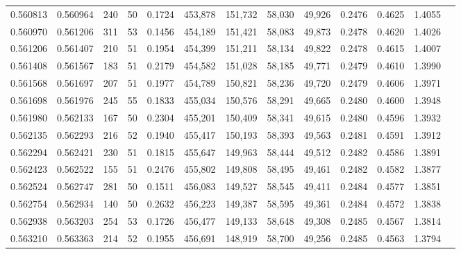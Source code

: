 \begin{tabular}{rrrrrrrrrrrrr}
0.560813 & 0.560964 &   240 &  50 &                                     0.1724 & 453,878 & 151,732 &  58,030 &  49,926 & 0.2476 & 0.4625 & 1.4055 \\
0.560970 & 0.561206 &   311 &  53 &                                     0.1456 & 454,189 & 151,421 &  58,083 &  49,873 & 0.2478 & 0.4620 & 1.4026 \\
0.561206 & 0.561407 &   210 &  51 &                                     0.1954 & 454,399 & 151,211 &  58,134 &  49,822 & 0.2478 & 0.4615 & 1.4007 \\
0.561408 & 0.561567 &   183 &  51 &                                     0.2179 & 454,582 & 151,028 &  58,185 &  49,771 & 0.2479 & 0.4610 & 1.3990 \\
0.561568 & 0.561697 &   207 &  51 &                                     0.1977 & 454,789 & 150,821 &  58,236 &  49,720 & 0.2479 & 0.4606 & 1.3971 \\
0.561698 & 0.561976 &   245 &  55 &                                     0.1833 & 455,034 & 150,576 &  58,291 &  49,665 & 0.2480 & 0.4600 & 1.3948 \\
0.561980 & 0.562133 &   167 &  50 &                                     0.2304 & 455,201 & 150,409 &  58,341 &  49,615 & 0.2480 & 0.4596 & 1.3932 \\
0.562135 & 0.562293 &   216 &  52 &                                     0.1940 & 455,417 & 150,193 &  58,393 &  49,563 & 0.2481 & 0.4591 & 1.3912 \\
0.562294 & 0.562421 &   230 &  51 &                                     0.1815 & 455,647 & 149,963 &  58,444 &  49,512 & 0.2482 & 0.4586 & 1.3891 \\
0.562423 & 0.562522 &   155 &  51 &                                     0.2476 & 455,802 & 149,808 &  58,495 &  49,461 & 0.2482 & 0.4582 & 1.3877 \\
0.562524 & 0.562747 &   281 &  50 &                                     0.1511 & 456,083 & 149,527 &  58,545 &  49,411 & 0.2484 & 0.4577 & 1.3851 \\
0.562754 & 0.562934 &   140 &  50 &                                     0.2632 & 456,223 & 149,387 &  58,595 &  49,361 & 0.2484 & 0.4572 & 1.3838 \\
0.562938 & 0.563203 &   254 &  53 &                                     0.1726 & 456,477 & 149,133 &  58,648 &  49,308 & 0.2485 & 0.4567 & 1.3814 \\
0.563210 & 0.563363 &   214 &  52 &                                     0.1955 & 456,691 & 148,919 &  58,700 &  49,256 & 0.2485 & 0.4563 & 1.3794 \\

\end{tabular}
